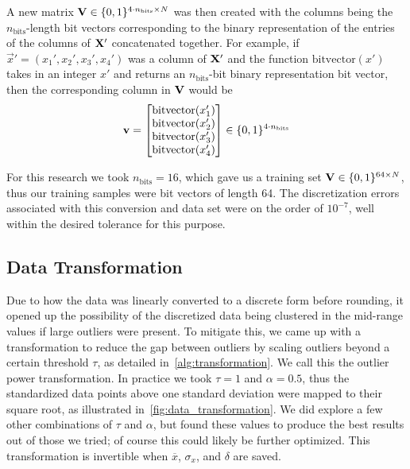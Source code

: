 A new matrix \( \mathbf{V} \in \{0,1\}^{4\cdot n_\text{bits} \times N} \) was then created with the columns being the \( n_\text{bits} \)-length bit vectors corresponding to the binary representation of the entries of the columns of \( \mathbf{X}' \) concatenated together.
For example, if \( \vec{x}' = (x_1',x_2',x_3',x_4') \) was a column of \( \mathbf{X}' \) and the function \( \text{bitvector}(x') \) takes in an integer \( x' \) and returns an \( n_\text{bits} \)-bit binary representation bit vector, then the corresponding column in \( \mathbf{V} \) would be
\begin{align}
    \mathbf{v} = \begin{bmatrix}
        \text{bitvector}(x_1') \\
        \text{bitvector}(x_2') \\
        \text{bitvector}(x_3') \\
        \text{bitvector}(x_4') \\
    \end{bmatrix}
    \in \{0,1\}^{4\cdot n_\text{bits}}
\end{align}

For this research we took \( n_\text{bits} = 16 \), which gave us a training set \( \mathbf{V} \in \{0,1\}^{64 \times N} \), thus our training samples were bit vectors of length 64.
The discretization errors associated with this conversion and data set were on the order of \( 10^{-7} \), well within the desired tolerance for this purpose.

\subsection{Data Transformation}\label{sec:outlier_transform}
Due to how the data was linearly converted to a discrete form before rounding, it opened up the possibility of the discretized data being clustered in the mid-range values if large outliers were present.
To mitigate this, we came up with a transformation to reduce the gap between outliers by scaling outliers beyond a certain threshold \( \tau \), as detailed in~\cref{alg:transformation}.
We call this the outlier power transformation.
In practice we took \( \tau = 1 \) and \( \alpha = 0.5 \), thus the standardized data points above one standard deviation were mapped to their square root, as illustrated in~\cref{fig:data_transformation}.
We did explore a few other combinations of \( \tau \) and \( \alpha \), but found these values to produce the best results out of those we tried; of course this could likely be further optimized.
This transformation is invertible when \( \overline{x} \), \( \sigma_x \), and \( \delta \) are saved.

